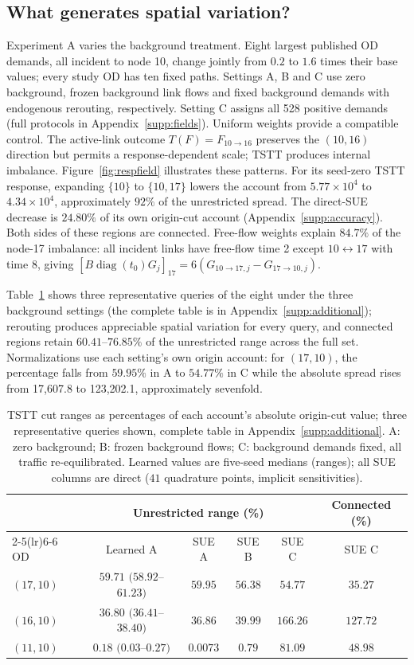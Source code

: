 \subsection{What generates spatial variation?}\label{sec:variation}
Experiment A varies the background treatment. Eight largest published OD demands, all incident to node 10, change jointly from $0.2$ to $1.6$ times their base values; every study OD has ten fixed paths. Settings A, B and C use zero background, frozen background link flows and fixed background demands with endogenous rerouting, respectively. Setting C assigns all 528 positive demands (full protocols in Appendix~\ref{supp:fields}).
Uniform weights provide a compatible control. The active-link outcome $T(F)=F_{10\to16}$ preserves the $(10,16)$ direction but permits a response-dependent scale; TSTT produces internal imbalance. Figure~\ref{fig:respfield} illustrates these patterns. For its seed-zero TSTT response, expanding $\{10\}$ to $\{10,17\}$ lowers the account from $5.77\times10^4$ to $4.34\times10^4$, approximately $92\%$ of the unrestricted spread. The direct-SUE decrease is $24.80\%$ of its own origin-cut account (Appendix~\ref{supp:accuracy}). Both sides of these regions are connected. Free-flow weights explain $84.7\%$ of the node-17 imbalance: all incident links have free-flow time 2 except $10\leftrightarrow17$ with time 8, giving $[B\operatorname{diag}(t_0)G_j]_{17}=6(G_{10\to17,j}-G_{17\to10,j})$.

Table~\ref{tab:cutspreadperod} shows three representative queries of the eight under the three background settings (the complete table is in Appendix~\ref{supp:additional}); rerouting produces appreciable spatial variation for every query, and connected regions retain $60.41$--$76.85\%$ of the unrestricted range across the full set. Normalizations use each setting's own origin account: for $(17,10)$, the percentage falls from $59.95\%$ in A to $54.77\%$ in C while the absolute spread rises from 17,607.8 to 123,202.1, approximately sevenfold.
\begin{table}[pos=htbp]
\caption{TSTT cut ranges as percentages of each account's absolute
origin-cut value; three representative queries shown, complete table in
Appendix~\ref{supp:additional}. A: zero background; B: frozen background
flows; C: background demands fixed, all traffic re-equilibrated. Learned
values are five-seed medians (ranges); all SUE columns are direct
($41$ quadrature points, implicit sensitivities).}\label{tab:cutspreadperod}
\small
\begin{tabular*}{\tblwidth}{@{\extracolsep{\fill}}lccccc}
\toprule
& \multicolumn{4}{c}{Unrestricted range (\%)} & Connected (\%)\\
\cmidrule(lr){2-5}\cmidrule(lr){6-6}
OD & Learned A & SUE A & SUE B & SUE C & SUE C\\
\midrule
$(17,10)$ & $59.71$ $(58.92$--$61.23)$ & $59.95$ & $56.38$ & $54.77$ & $35.27$ \\
$(16,10)$ & $36.80$ $(36.41$--$38.40)$ & $36.86$ & $39.99$ & $166.26$ & $127.72$ \\
$(11,10)$ & $0.18$ $(0.03$--$0.27)$ & $0.0073$ & $0.79$ & $81.09$ & $48.98$ \\
\bottomrule
\end{tabular*}
\end{table}
